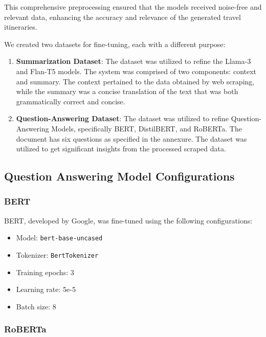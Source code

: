 \documentclass[conference]{IEEEtran}
\begin{document}
        This comprehensive preprocessing ensured that the models received noise-free and relevant data, enhancing the accuracy and relevance of the generated travel itineraries.


        We created two datasets for fine-tuning, each with a different purpose:

        \begin{enumerate}
            \item \textbf{Summarization Dataset}: The dataset was utilized to refine the Llama-3 and Flan-T5 models. The system was comprised of two components: context and summary. The context pertained to the data obtained by web scraping, while the summary was a concise translation of the text that was both grammatically correct and concise.\\


            \item \textbf{Question-Answering Dataset}: The dataset was utilized to refine Question-Answering Models, specifically BERT, DistilBERT, and RoBERTa. The document has six questions as specified in the annexure. The dataset was utilized to get significant insights from the processed scraped data.
        \end{enumerate}

    \subsection{Question Answering Model Configurations}

        \subsubsection{BERT}

            BERT, developed by Google, was fine-tuned using the following configurations:
            \begin{itemize}
                \item Model: \texttt{bert-base-uncased}
                \item Tokenizer: \texttt{BertTokenizer}
                \item Training epochs: 3
                \item Learning rate: 5e-5
                \item Batch size: 8
            \end{itemize}

        \subsubsection{RoBERTa}
\end{document}
